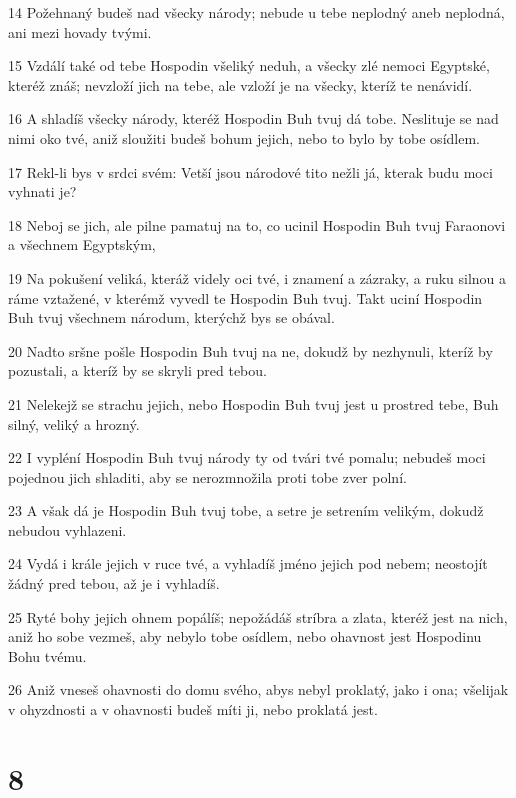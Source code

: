 \par 14 Požehnaný budeš nad všecky národy; nebude u tebe neplodný aneb neplodná, ani mezi hovady tvými.
\par 15 Vzdálí také od tebe Hospodin všeliký neduh, a všecky zlé nemoci Egyptské, kteréž znáš; nevzloží jich na tebe, ale vzloží je na všecky, kteríž te nenávidí.
\par 16 A shladíš všecky národy, kteréž Hospodin Buh tvuj dá tobe. Neslituje se nad nimi oko tvé, aniž sloužiti budeš bohum jejich, nebo to bylo by tobe osídlem.
\par 17 Rekl-li bys v srdci svém: Vetší jsou národové tito nežli já, kterak budu moci vyhnati je?
\par 18 Neboj se jich, ale pilne pamatuj na to, co ucinil Hospodin Buh tvuj Faraonovi a všechnem Egyptským,
\par 19 Na pokušení veliká, kteráž videly oci tvé, i znamení a zázraky, a ruku silnou a ráme vztažené, v kterémž vyvedl te Hospodin Buh tvuj. Takt uciní Hospodin Buh tvuj všechnem národum, kterýchž bys se obával.
\par 20 Nadto sršne pošle Hospodin Buh tvuj na ne, dokudž by nezhynuli, kteríž by pozustali, a kteríž by se skryli pred tebou.
\par 21 Nelekejž se strachu jejich, nebo Hospodin Buh tvuj jest u prostred tebe, Buh silný, veliký a hrozný.
\par 22 I vypléní Hospodin Buh tvuj národy ty od tvári tvé pomalu; nebudeš moci pojednou jich shladiti, aby se nerozmnožila proti tobe zver polní.
\par 23 A však dá je Hospodin Buh tvuj tobe, a setre je setrením velikým, dokudž nebudou vyhlazeni.
\par 24 Vydá i krále jejich v ruce tvé, a vyhladíš jméno jejich pod nebem; neostojít žádný pred tebou, až je i vyhladíš.
\par 25 Ryté bohy jejich ohnem popálíš; nepožádáš stríbra a zlata, kteréž jest na nich, aniž ho sobe vezmeš, aby nebylo tobe osídlem, nebo ohavnost jest Hospodinu Bohu tvému.
\par 26 Aniž vneseš ohavnosti do domu svého, abys nebyl proklatý, jako i ona; všelijak v ohyzdnosti a v ohavnosti budeš míti ji, nebo proklatá jest.

\chapter{8}

